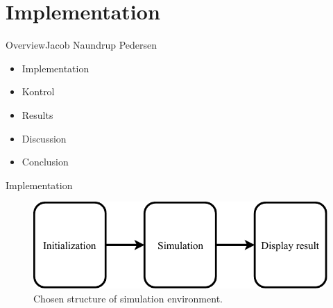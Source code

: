 \section{Implementation}

\begin{frame}{Overview}{Jacob Naundrup Pedersen}
\begin{itemize}
	
\item Implementation
\item Kontrol
\item Results
\item Discussion
\item Conclusion
\end{itemize}
\end{frame}

\begin{frame}{Implementation}{}

\begin{figure}[H]
\centering
\includegraphics[width=0.75 \textwidth]{figures/Basic_implementation}
\caption{Chosen structure of simulation environment.}
\label{fig:Basic_implementation}
\end{figure}


\end{frame}

